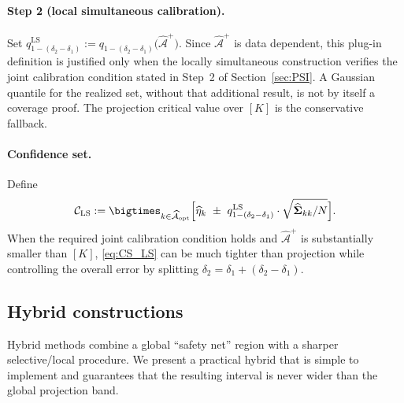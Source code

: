 \documentclass[12pt]{article}
\theoremstyle{remark}\newtheorem{remark}[theorem]{Remark}\theoremstyle{plain}
\begin{document}
\paragraph{Step 2 (local simultaneous calibration).}
Set
$
q^{\mathrm{LS}}_{1-(\delta_2-\delta_1)}:=q_{1-(\delta_2-\delta_1)}\bigl(\widehat{\mathcal{A}}^{+}\bigr).
$
Since $\widehat{\mathcal A}^{+}$ is data dependent, this plug-in
definition is justified only when the locally simultaneous
construction verifies the joint calibration condition stated in
Step~2 of Section~\ref{sec:PSI}.  A Gaussian quantile for the realized
set, without that additional result, is not by itself a coverage
proof.  The projection critical value over $[K]$ is the conservative
fallback.

\paragraph{Confidence set.}
Define
\begin{equation*}\label{eq:CS_LS}
\mathcal{C}_{\mathrm{LS}}
:=
\bigtimes_{k\in\widehat{\mathcal{A}}_{\mathrm{opt}}}
\Bigl[
\widehat{\eta}_k \ \pm\ q^{\mathrm{LS}}_{1-(\delta_2-\delta_1)}\cdot \sqrt{\widehat{\boldsymbol{\Sigma}}_{kk}/N}
\Bigr].
\end{equation*}
When the required joint calibration condition holds and
$\widehat{\mathcal{A}}^{+}$ is substantially smaller than $[K]$,
\eqref{eq:CS_LS} can be much tighter than projection while controlling
the overall error by splitting
$\delta_2=\delta_1+(\delta_2-\delta_1)$.

\subsection{Hybrid constructions}\label{subsec:hybrid}
Hybrid methods combine a global ``safety net'' region with a sharper selective/local procedure.
We present a practical hybrid that is simple to implement and guarantees that the resulting interval
is never wider than the global projection band.
\end{document}
